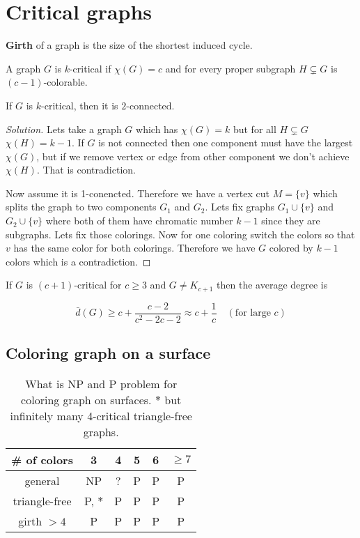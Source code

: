 \chapter{Critical graphs}

\begin{defn}
	\textbf{Girth} of a graph is the size of the shortest induced cycle.
\end{defn}

\begin{defn}
	A graph $G$ is $k$-critical if $\chi(G) = c$ and for every proper subgraph $H \subsetneq G$ is $(c-1)$-colorable.
\end{defn}


\begin{exerc}
	If $G$ is $k$-critical, then it is $2$-connected.
\end{exerc}

\begin{proof}[Solution]
	Lets take a graph $G$ which has $\chi(G) = k$ but for all $H \subsetneq G$ $\chi(H) = k-1$. If $G$ is not connected then one component must have the largest $\chi(G)$, but if we remove vertex or edge from other component we don't achieve $\chi(H)$. That is contradiction.
	
	Now assume it is 1-conencted. Therefore we have a vertex cut $M = \{v\}$ which splits the graph to two components $G_1$ and $G_2$. Lets fix graphs $G_1 \cup \{v\}$ and $G_2 \cup \{v\}$ where both of them have chromatic number $k - 1$ since they are subgraphs. Lets fix those colorings. Now for one coloring switch the colors so that $v$ has the same color for both colorings. Therefore we have $G$ colored by $k-1$ colors which is a contradiction.
\end{proof}

\begin{thm}
	If $G$ is $(c+1)$-critical for $c \geq 3$ and $G \neq K_{c+1}$ then the average degree is
	
	$$
	\bar{d}(G) \geq c + \frac{c-2}{c^2 - 2c -2} \approx c + \frac{1}{c} \quad (\text{for large } c)
	$$
\end{thm}

\section{Coloring graph on a surface}

\begin{table}[!ht]\centering
	\begin{tabular}{c|c|c|c|c|c}
		\# of colors & 3 & 4 & 5 & 6 & $\geq 7$ \\
		\hline
		general & NP & ? & P & P & P \\
		triangle-free & P, $\ast$ & P & P & P & P \\
		girth $> 4$ & P & P & P & P & P
	\end{tabular}
	\caption{What is NP and P problem for coloring graph on surfaces. \small{$\ast$ but infinitely many 4-critical triangle-free graphs.}}
\end{table}

